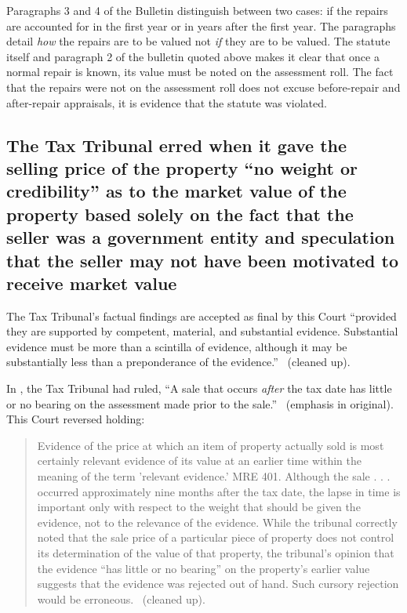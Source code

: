 \documentclass[12pt,\documentclassflag]{michiganCourtOfAppealsBrief}
\begin{document}
Paragraphs 3 and 4 of the Bulletin distinguish between two cases: if the repairs are accounted for in the first year or in years after the first year. The paragraphs detail \textit{how} the repairs are to be valued not \textit{if} they are to be valued. The statute itself and paragraph 2 of the bulletin quoted above makes it clear that once a normal repair is known, its value must be noted on the assessment roll. The fact that the repairs were not on the assessment roll does not excuse before-repair and after-repair appraisals, it is evidence that the statute was violated.

\subsection{The Tax Tribunal erred when it gave the selling price of the property ``no weight or credibility'' as to the market value of the property based solely on the fact that the seller was a government entity and speculation that the seller may not have been motivated to receive market value}

The Tax Tribunal's factual findings are accepted as final by this Court ``provided they are supported by competent, material, and substantial evidence. Substantial evidence must be more than a scintilla of evidence, although it may be substantially less than a preponderance of the evidence.'' \ (cleaned up).

In \cite[s]{Jones & Laughlin}, the Tax Tribunal had ruled, ``A sale that occurs \textit{after} the tax date has little or no bearing on the assessment made prior to the sale.'' \ (emphasis in original). This Court reversed holding: 

\begin{quote}
Evidence of the price at which an item of property actually sold is most certainly relevant evidence of its value at an earlier time within the meaning of the term 'relevant evidence.' MRE 401. Although the sale . . . occurred approximately nine months after the tax date, the lapse in time is important only with respect to the weight that should be given the evidence, not to the relevance of the evidence. While the tribunal correctly noted that the sale price of a particular piece of property does not control its determination of the value of that property, the tribunal's opinion that the evidence ``has little or no bearing'' on the property's earlier value suggests that the evidence was rejected out of hand. Such cursory rejection would be erroneous. \ (cleaned up).
\end{quote} 
\end{document}
